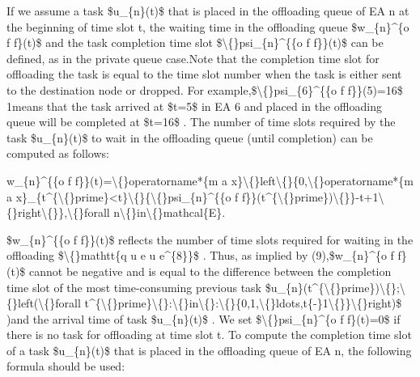 \documentclass{article}
\begin{document}
If we assume a task \$u\_\{n\}(t)\$ that is placed in the offloading queue of EA n at the beginning of time slot t, the waiting time in the offloading queue \$w\_\{n\}\textasciicircum{}\{o f f\}(t)\$ and the task completion time slot \$\textbackslash\{\}psi\_\{n\}\textasciicircum{}\{\{o f f\}\}(t)\$ can be defined, as in the private queue case.Note that the completion time slot for offloading the task is equal to the time slot number when the task is either sent to the destination node or dropped. For example,\$\textbackslash\{\}psi\_\{6\}\textasciicircum{}\{\{o f f\}\}(5)=16\$ 1means that the task arrived at \$t=5\$ in EA 6 and placed in the offloading queue will be completed at \$t=16\$ . The number of time slots required by the task \$u\_\{n\}(t)\$ to wait in the offloading queue (until completion) can be computed as follows:

w\_\{n\}\textasciicircum{}\{\{o f f\}\}(t)=\textbackslash\{\}operatorname*\{m a x\}\textbackslash\{\}left\textbackslash\{\}\{0,\textbackslash\{\}operatorname*\{m a x\}\_\{t\textasciicircum{}\{\textbackslash\{\}prime\}<t\}\textbackslash\{\}\{\textbackslash\{\}psi\_\{n\}\textasciicircum{}\{\{o f f\}\}(t\textasciicircum{}\{\textbackslash\{\}prime\})\textbackslash\{\}\}-t+1\textbackslash\{\}right\textbackslash\{\}\},\textbackslash\{\}forall n\textbackslash\{\}in\textbackslash\{\}mathcal\{E\}.

\$w\_\{n\}\textasciicircum{}\{\{o f f\}\}(t)\$ reflects the number of time slots required for waiting in the offloading \$\textbackslash\{\}mathtt\{q u e u e\textasciicircum{}\{8\}\}\$ . Thus, as implied by (9),\$w\_\{n\}\textasciicircum{}\{o f f\}(t)\$ cannot be negative and is equal to the difference between the completion time slot of the most time-consuming previous task \$u\_\{n\}(t\textasciicircum{}\{\textbackslash\{\}prime\})\textbackslash\{\};\textbackslash\{\}left(\textbackslash\{\}forall t\textasciicircum{}\{\textbackslash\{\}prime\}\textbackslash\{\}:\textbackslash\{\}in\textbackslash\{\}:\textbackslash\{\}\{0,1,\textbackslash\{\}ldots,t\{-\}1\textbackslash\{\}\}\textbackslash\{\}right)\$ )and the arrival time of task \$u\_\{n\}(t)\$ . We set \$\textbackslash\{\}psi\_\{n\}\textasciicircum{}\{o f f\}(t)=0\$ if there is no task for offloading at time slot t. To compute the completion time slot of a task \$u\_\{n\}(t)\$ that is placed in the offloading queue of EA n, the following formula should be used:
\end{document}
